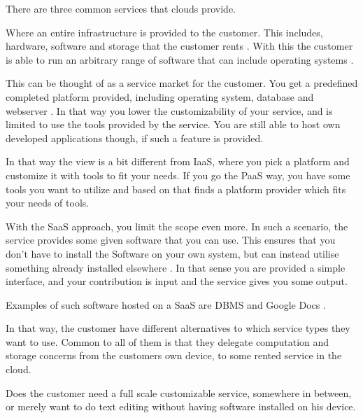 There are three common services that clouds provide.
\begin{description}[style=nextline]
\item[Infrastructure as a Service (IaaS)]
Where an entire infrastructure is provided to the customer.
This includes, hardware, software and storage that the customer rents \citep{article:mobilecloudreviewinderkilde}.
With this the customer is able to run an arbitrary range of software that can include operating systems \citep{misc:indersuverymcc}.
\item[Platform as a Service (PaaS)]
This can be thought of as a service market for the customer.
You get a predefined completed platform provided, including operating system, database and webserver \cite{article:mobilecloudreviewinderkilde}.
In that way you lower the customizability of your service, and is limited to use the tools provided by the service.
You are still able to host own developed applications though, if such a feature is provided.

In that way the view is a bit different from IaaS, where you pick a platform and customize it with tools to fit your needs.
If you go the PaaS way, you have some tools you want to utilize and based on that finds a platform provider which fits your needs of tools.

\item[Software as a Service (SaaS)]
With the SaaS approach, you limit the scope even more.
In such a scenario, the service provides some given software that you can use.
This ensures that you don't have to install the Software on your own system, but can instead utilise something already installed elsewhere \citep{article:mobilecloudreviewinderkilde,misc:indersuverymcc}.
In that sense you are provided a simple interface, and your contribution is input and the service gives you some output.

Examples of such software hosted on a SaaS are DBMS and Google Docs \citep{article:mobilecloudreviewinderkildesecurity}. 
\end{description}
In that way, the customer have different alternatives to which service types they want to use.
Common to all of them is that they delegate computation and storage concerns from the customers own device, to some rented service in the cloud.

Does the customer need a full scale customizable service, somewhere in between, or merely want to do text editing without having software installed on his device.